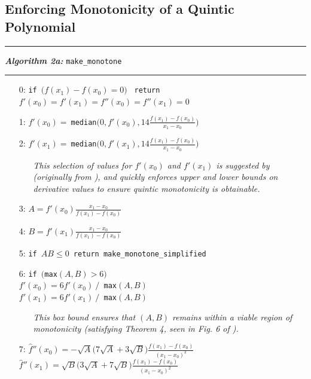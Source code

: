 \documentclass{scspaperproc}
\theoremstyle{scsthe}
\begin{document}
\subsection{Enforcing Monotonicity of a Quintic Polynomial}


\vspace{10pt}%
\hrule%
\vspace{3pt}%
\noindent\textbf{\textit{Algorithm 2a:}} \texttt{make\_monotone}%
\vspace{3pt}%
\hrule%

\begin{itemize}
  \itemsep0pt
  \parskip0pt

\item[0:] \texttt{if }$\big(f(x_1) - f(x_0) = 0\big)$ \texttt{ return } $f'(x_0) = f'(x_1) = f''(x_0) = f''(x_1) = 0$
\item[1:] $f'(x_0) = \ $\texttt{median}$\big(0, f'(x_0), 14 \frac{f(x_1) - f(x_0)}{x_1 - x_0} \big)$
\item[2:] $f'(x_1) = \ $\texttt{median}$\big(0, f'(x_1), 14 \frac{f(x_1) - f(x_0)}{x_1 - x_0}\big)$
  \begin{itemize}
  \item[] \textit{This selection of values for $f'(x_0)$ and $f'(x_1)$ is suggested by \cite{ulrich1994positivity} (originally from \cite{huynh1993accurate}), and quickly enforces upper and lower bounds on derivative values to ensure quintic monotonicity is obtainable.}
  \end{itemize}
\item[3:] $A = f'(x_0)\frac{x_1 - x_0}{f(x_1) - f(x_0)}$
\item[4:] $B = f'(x_1) \frac{x_1 - x_0}{f(x_1) - f(x_0)}$
\item[5:] \texttt{if }$AB \leq 0$\texttt{ return make\_monotone\_simplified}
\item[6:] \texttt{if $\big($max}$(A,B) > 6\big)$\\$f'(x_0) = 6 f'(x_0)\  /$\texttt{ max}$(A,B)$\\$f'(x_1) = 6 f'(x_1)\  /$\texttt{ max}$(A,B)$

  \begin{itemize}
  \item[] \textit{This box bound ensures that $(A,B)$ remains within a viable region of monotonicity (satisfying Theorem 4, seen in Fig. 6 of \cite{ulrich1994positivity}).}
  \end{itemize}

\item[7:] $\hat f''(x_0) = - \sqrt{A} \big( 7 \sqrt{A} + 3 \sqrt{B} \big) \frac{f(x_1) - f(x_0)}{(x_1 - x_0)^2}$\\$\hat f''(x_1) = \sqrt{B} \big( 3 \sqrt{A} + 7 \sqrt{B} \big) \frac{f(x_1) - f(x_0)}{(x_1 - x_0)^2}$


\end{itemize}
\end{document}
